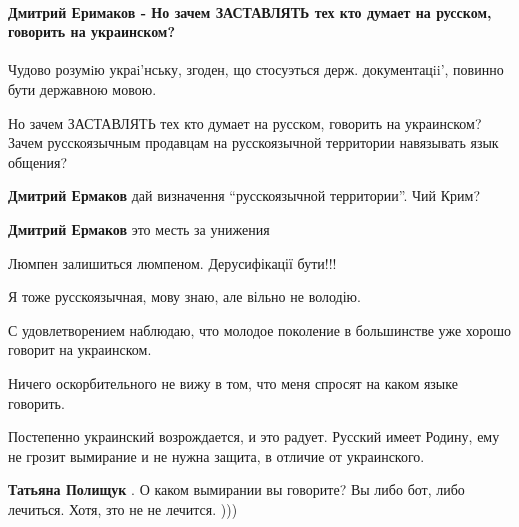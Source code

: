  
 
 
 
 
\paragraph{Дмитрий Еримаков - Но зачем ЗАСТАВЛЯТЬ тех кто думает на русском, говорить на украинском?}

\begin{itemize}
Чудово розумiю украi'нську, згоден, що стосуэться держ. документацii', повинно бути державною мовою.

Но зачем ЗАСТАВЛЯТЬ тех кто думает на русском, говорить на украинском? Зачем
русскоязычным продавцам на русскоязычной территории навязывать язык общения?


\textbf{Дмитрий Ермаков} дай визначення \enquote{русскоязычной территории}. Чий Крим?

\textbf{Дмитрий Ермаков} это месть за унижения

Люмпен залишиться люмпеном. Дерусифікації бути!!!


Я тоже русскоязычная, мову знаю, але вільно не володію.

С удовлетворением наблюдаю, что молодое поколение в большинстве уже хорошо
говорит на украинском.

Ничего оскорбительного не вижу в том, что меня спросят на каком языке говорить.

Постепенно украинский возрождается, и это радует. Русский имеет Родину, ему не
грозит вымирание и не нужна защита, в отличие от украинского.

\begin{itemize}
\textbf{Татьяна Полищук} . О каком вымирании вы говорите? Вы либо бот, либо лечиться. Хотя, зто не не лечится. )))


\end{itemize}
\end{itemize}
